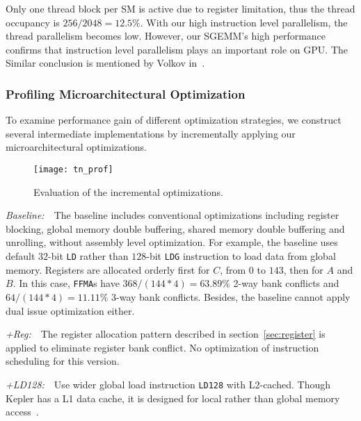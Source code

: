 
Only one thread block per SM is active due to register limitation, thus the thread occupancy is $256/2048=12.5\%$.
With our high instruction level parallelism, the thread parallelism becomes low.
However, our SGEMM's high performance confirms that instruction level parallelism plays an important role on GPU.
The Similar conclusion is mentioned by Volkov in~\cite{volkov2010better}.

\subsubsection{Profiling Microarchitectural Optimization}

To examine performance gain of different optimization strategies, we construct several intermediate 
implementations by incrementally applying our microarchitectural optimizations.
\begin{figure}[htbp]
\begin{center}
\texttt{[image: tn\_prof]}
    \caption{Evaluation of the incremental optimizations.}
\label{fig:th_prof}
\end{center}
\end{figure}

{\it Baseline:}~~The baseline includes conventional optimizations including register blocking, global
memory double buffering, shared memory double buffering and unrolling, without assembly level optimization.
For example, the baseline uses default $32$-bit {\tt LD} rather than $128$-bit {\tt LDG} instruction to load data from global memory.
Registers are allocated orderly first for $C$, from $0$ to $143$, then for $A$ and $B$. 
In this case, {\tt FFMA}s have $368/(144*4)=63.89\%$ 2-way bank conflicts and $64/(144*4)=11.11\%$ 3-way bank conflicts. 
Besides, the baseline cannot apply dual issue optimization either.

{\it +Reg:}~~The register allocation pattern described in section~\ref{sec:register} is applied to eliminate register bank conflict. 
No optimization of instruction scheduling for this version.

{\it +LD128:}~~Use wider global load instruction {\tt LD128} with L2-cached.
Though Kepler has a L1 data cache, it is designed for local rather than global memory access~\cite{gk110}.

